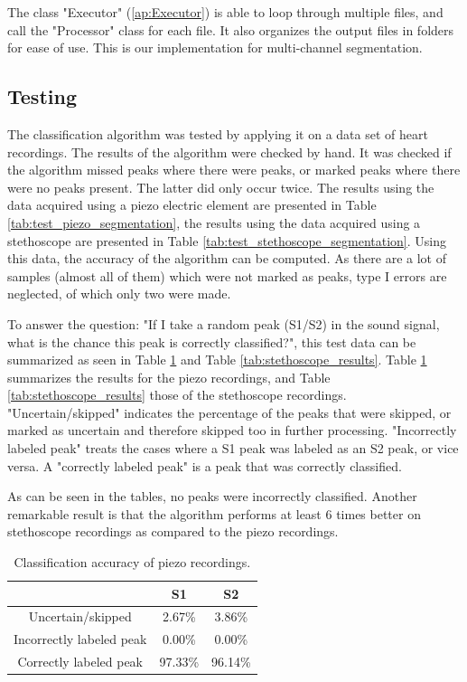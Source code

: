 The class "Executor" (\ref{ap:Executor}) is able to loop through multiple files, and call the "Processor" class for each file. It also organizes the output files in folders for ease of use. This is our implementation for multi-channel segmentation.


\subsection{Testing}

The classification algorithm was tested by applying it on a data set of heart recordings. The results of the algorithm were checked by hand. It was checked if the algorithm missed peaks where there were peaks, or marked peaks where there were no peaks present. The latter did only occur twice. The results using the data acquired using a piezo electric element are presented in Table \ref{tab:test_piezo_segmentation}, the results using the data acquired using a stethoscope are presented in Table \ref{tab:test_stethoscope_segmentation}. Using this data, the accuracy of the algorithm can be computed. As there are a lot of samples (almost all of them) which were not marked as peaks, type I errors are neglected, of which only two were made.

To answer the question: "If I take a random peak (S1/S2) in the sound signal, what is the chance this peak is correctly classified?", this test data can be summarized as seen in Table \ref{tab:piezo_results} and Table \ref{tab:stethoscope_results}. Table \ref{tab:piezo_results} summarizes the results for the piezo recordings, and Table \ref{tab:stethoscope_results} those of the stethoscope recordings. "Uncertain/skipped" indicates the percentage of the peaks that were skipped, or marked as uncertain and therefore skipped too in further processing. "Incorrectly labeled peak" treats the cases where a S1 peak was labeled as an S2 peak, or vice versa. A "correctly labeled peak" is a peak that was correctly classified. 

As can be seen in the tables, no peaks were incorrectly classified. Another remarkable result is that the algorithm performs at least 6 times better on stethoscope recordings as compared to the piezo recordings. 

\begin{table}[ht!]
\scriptsize
\centering
\captionsetup{justification=centering}
\begin{tabular}{|c|c|c|}
\hline
 & \textbf{S1} & \textbf{S2} \\
\hline
Uncertain/skipped & 2.67\% & 3.86\% \\
Incorrectly labeled peak & 0.00\% & 0.00\% \\
Correctly labeled peak & 97.33\% & 96.14\% \\
\hline
\end{tabular}
\caption{Classification accuracy of piezo recordings.}
\label{tab:piezo_results}
\end{table}


